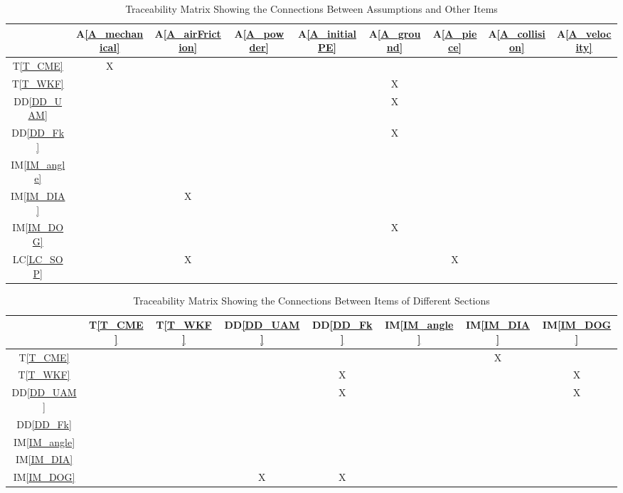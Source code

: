 \documentclass[12pt]{article}
\newcommand{\ddref}[1]{DD\ref{#1}}
\newcommand{\tref}[1]{T\ref{#1}}
\newcommand{\aref}[1]{A\ref{#1}}
\newcommand{\iref}[1]{IM\ref{#1}}
\newcommand{\lcref}[1]{LC\ref{#1}}
\begin{document}
			\begin{table}[h!]
				\centering
				\begin{tabular}{|c|c|c|c|c|c|c|c|c|}
					\hline
					& \aref{A_mechanical}& \aref{A_airFriction}& \aref{A_powder}& \aref{A_initialPE}& \aref{A_ground}& \aref{A_piece}& \aref{A_collision}&
					\aref{A_velocity}\\
					\hline
					\tref{T_CME}        & X& & & & & & &\\ \hline
					\tref{T_WKF}        & & & & & X& & &\\ \hline
					\ddref{DD_UAM}        & & & & & X& & &\\ \hline
					\ddref{DD_Fk}        & & & & & X& & &\\ \hline
					\iref{IM_angle}        & & & & & & & &\\ \hline
					\iref{IM_DIA}        & & X& & & & & &\\ \hline
					\iref{IM_DOG}        & & & & & X& & &\\ \hline
					\lcref{LC_SOP}        & & X& & & & X& &\\ \hline
				\end{tabular}
				\caption{Traceability Matrix Showing the Connections Between Assumptions and Other Items}
				\label{Table:A_trace}
			\end{table}
	
	\begin{table}[h!]
		\centering
		\begin{tabular}{|c|c|c|c|c|c|c|c|}
			\hline        
			& \tref{T_CME}& \tref{T_WKF}& \ddref{DD_UAM}& \ddref{DD_Fk} &\iref{IM_angle} & \iref{IM_DIA}& \iref{IM_DOG} \\
			\hline
			\tref{T_CME}        & & & & & & X&\\ \hline
			\tref{T_WKF}        & & & & X& & &X\\ \hline
			\ddref{DD_UAM}        & & & & X& & &X\\ \hline
			\ddref{DD_Fk}        & & & & & & &\\ \hline
			\iref{IM_angle}        & & & & & & &\\ \hline
			\iref{IM_DIA}        & & & & & & &\\ \hline
			\iref{IM_DOG}        & & & X& X& & &\\ \hline
		\end{tabular}
		\caption{Traceability Matrix Showing the Connections Between Items of Different Sections}
		\label{Table:trace}
	\end{table}
	
\end{document}
